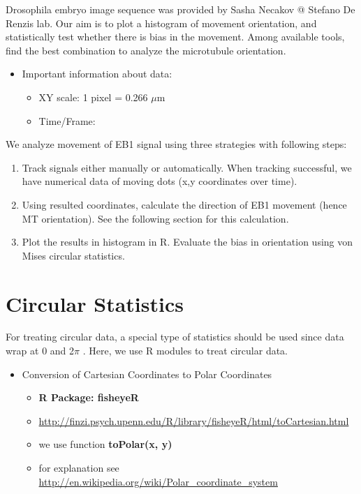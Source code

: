 \documentclass[11pnt, twocolumn]{article}
\begin{document}
Drosophila embryo image sequence was provided by Sasha Necakov @ Stefano De Renzis lab. Our aim is to plot a histogram of movement orientation, and statistically test whether there is bias in the movement. Among available tools, find the best combination to analyze the microtubule orientation.

\begin{itemize}
\item Important information about data:
\begin{itemize}
\item XY scale: 1 pixel = 0.266 $\mu$m
\item Time/Frame: 
\end{itemize}
\end{itemize}
We analyze movement of EB1 signal using three strategies with following steps: 
\begin{enumerate}
\item Track signals either manually or automatically. When tracking successful, we have numerical data of moving dots (x,y coordinates over time). 
\item Using resulted coordinates, calculate the direction of EB1 movement (hence MT orientation). See the following section for this calculation. 
\item Plot the results in histogram in R. Evaluate the bias in orientation using von Mises circular statistics. 
\end{enumerate}

\section{Circular Statistics}

For treating circular data, a special type of statistics should be used since data wrap at 0 and 2$\pi$ \citep{Fisher1993}. Here, we use R modules to treat circular data.  

\begin{itemize}
\item Conversion of Cartesian Coordinates to Polar Coordinates
\begin{itemize}
\item \textbf{R Package: fisheyeR}
\item \url{http://finzi.psych.upenn.edu/R/library/fisheyeR/html/toCartesian.html}
\item we use function \textbf{toPolar(x, y)}
\item for explanation see \url{http://en.wikipedia.org/wiki/Polar\_coordinate\_system}
\end{itemize}
\end{itemize}
\end{document}
